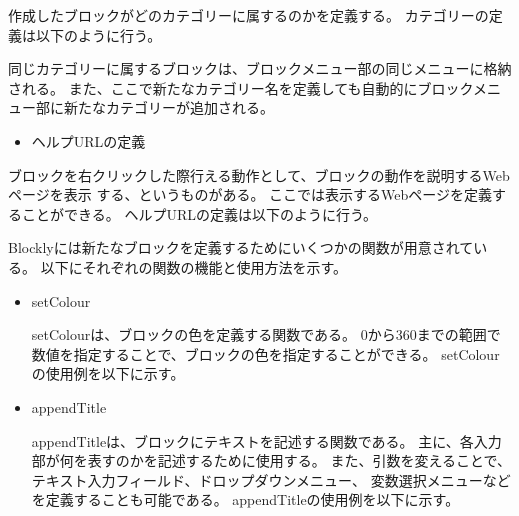 \documentclass{risepaper}
\begin{document}
作成したブロックがどのカテゴリーに属するのかを定義する。
カテゴリーの定義は以下のように行う。


同じカテゴリーに属するブロックは、ブロックメニュー部の同じメニューに格納される。
また、ここで新たなカテゴリー名を定義しても自動的にブロックメニュー部に新たなカテゴリーが追加される。

\begin{itemize}
\item ヘルプURLの定義
\end{itemize}

ブロックを右クリックした際行える動作として、ブロックの動作を説明するWebページを表示
する、というものがある。
ここでは表示するWebページを定義することができる。
ヘルプURLの定義は以下のように行う。


Blocklyには新たなブロックを定義するためにいくつかの関数が用意されている。
以下にそれぞれの関数の機能と使用方法を示す。

\begin{itemize}
\item setColour

setColourは、ブロックの色を定義する関数である。
0から360までの範囲で数値を指定することで、ブロックの色を指定することができる。
setColourの使用例を以下に示す。


\end{itemize}

\begin{itemize}
\item appendTitle

appendTitleは、ブロックにテキストを記述する関数である。
主に、各入力部が何を表すのかを記述するために使用する。
また、引数を変えることで、テキスト入力フィールド、ドロップダウンメニュー、
変数選択メニューなどを定義することも可能である。
appendTitleの使用例を以下に示す。


\end{itemize}
\end{document}
